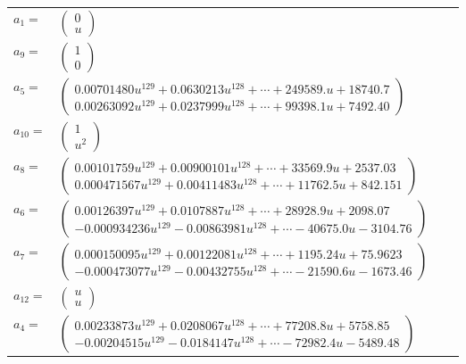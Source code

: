 \documentclass[1p]{elsarticle_modified}
\theoremstyle{definition}
\begin{document}
\begin{tabular}{m{7pt} m{180pt} m{7pt} m{180pt} }
\flushright $a_{1}=$&$\begin{pmatrix}0\\u\end{pmatrix}$ \\
\flushright $a_{9}=$&$\begin{pmatrix}1\\0\end{pmatrix}$ \\
\flushright $a_{5}=$&$\begin{pmatrix}0.00701480 u^{129}+0.0630213 u^{128}+\cdots+249589. u+18740.7\\0.00263092 u^{129}+0.0237999 u^{128}+\cdots+99398.1 u+7492.40\end{pmatrix}$ \\
\flushright $a_{10}=$&$\begin{pmatrix}1\\u^2\end{pmatrix}$ \\
\flushright $a_{8}=$&$\begin{pmatrix}0.00101759 u^{129}+0.00900101 u^{128}+\cdots+33569.9 u+2537.03\\0.000471567 u^{129}+0.00411483 u^{128}+\cdots+11762.5 u+842.151\end{pmatrix}$ \\
\flushright $a_{6}=$&$\begin{pmatrix}0.00126397 u^{129}+0.0107887 u^{128}+\cdots+28928.9 u+2098.07\\-0.000934236 u^{129}-0.00863981 u^{128}+\cdots-40675.0 u-3104.76\end{pmatrix}$ \\
\flushright $a_{7}=$&$\begin{pmatrix}0.000150095 u^{129}+0.00122081 u^{128}+\cdots+1195.24 u+75.9623\\-0.000473077 u^{129}-0.00432755 u^{128}+\cdots-21590.6 u-1673.46\end{pmatrix}$ \\
\flushright $a_{12}=$&$\begin{pmatrix}u\\u\end{pmatrix}$ \\
\flushright $a_{4}=$&$\begin{pmatrix}0.00233873 u^{129}+0.0208067 u^{128}+\cdots+77208.8 u+5758.85\\-0.00204515 u^{129}-0.0184147 u^{128}+\cdots-72982.4 u-5489.48\end{pmatrix}$ \\

\end{tabular}
\end{document}
